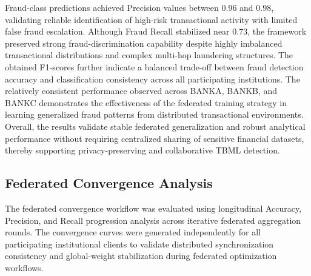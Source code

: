 Fraud-class predictions achieved Precision values between $0.96$ and $0.98$, validating reliable identification of high-risk transactional activity with limited false fraud escalation. Although Fraud Recall stabilized near $0.73$, the framework preserved strong fraud-discrimination capability despite highly imbalanced transactional distributions and complex multi-hop laundering structures. The obtained F1-scores further indicate a balanced trade-off between fraud detection accuracy and classification consistency across all participating institutions. The relatively consistent performance observed across BANKA, BANKB, and BANKC demonstrates the effectiveness of the federated training strategy in learning generalized fraud patterns from distributed transactional environments. Overall, the results validate stable federated generalization and robust analytical performance without requiring centralized sharing of sensitive financial datasets, thereby supporting privacy-preserving and collaborative TBML detection.

\subsection[Federated Convergence Analysis]{\textbf{Federated Convergence Analysis}}

The federated convergence workflow was evaluated using longitudinal Accuracy, Precision, and Recall progression analysis across iterative federated aggregation rounds. The convergence curves were generated independently for all participating institutional clients to validate distributed synchronization consistency and global-weight stabilization during federated optimization workflows.

